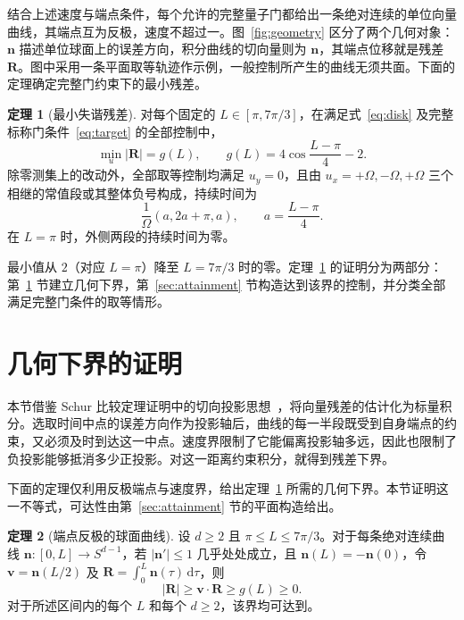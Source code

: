 \documentclass[12pt]{iopjournal}
\theoremstyle{definition}
\newtheorem{theorem}{定理}
\newcommand{\dd}{\mathrm{d}}
\newcommand{\nvec}{\mathbf n}
\newcommand{\Rvec}{\mathbf R}
\newcommand{\vvec}{\mathbf v}
\begin{document}
结合上述速度与端点条件，每个允许的完整量子门都给出一条绝对连续的单位向量曲线，其端点互为反极，速度不超过一。图~\ref{fig:geometry} 区分了两个几何对象：$\nvec$ 描述单位球面上的误差方向，积分曲线的切向量则为 $\nvec$，其端点位移就是残差 $\Rvec$。图中采用一条平面取等轨迹作示例，一般控制所产生的曲线无须共面。下面的定理确定完整门约束下的最小残差。




\begin{theorem}[最小失谐残差]
\label{thm:gate}
对每个固定的 $L\in[\pi,7\pi/3]$，在满足式~\eqref{eq:disk} 及完整标称门条件~\eqref{eq:target} 的全部控制中，
\begin{equation}
 \boxed{\min_u|\Rvec|=g(L),\qquad
 g(L)=4\cos\frac{L-\pi}{4}-2.}
 \label{eq:residual-minimum}
\end{equation}
除零测集上的改动外，全部取等控制均满足 $u_y=0$，且由 $u_x=+\Omega,-\Omega,+\Omega$ 三个相继的常值段或其整体负号构成，持续时间为
\begin{equation}
 \frac{1}{\Omega}(a,2a+\pi,a),\qquad
 a=\frac{L-\pi}{4}.
 \label{eq:family-durations}
\end{equation}
在 $L=\pi$ 时，外侧两段的持续时间为零。
\end{theorem}

最小值从 $2$（对应 $L=\pi$）降至 $L=7\pi/3$ 时的零。定理~\ref{thm:gate} 的证明分为两部分：第~\ref{sec:midpoint} 节建立几何下界，第~\ref{sec:attainment} 节构造达到该界的控制，并分类全部满足完整门条件的取等情形。

\section{几何下界的证明}
\label{sec:midpoint}

本节借鉴 Schur 比较定理证明中的切向投影思想~\cite{sullivan2008}，将向量残差的估计化为标量积分。选取时间中点的误差方向作为投影轴后，曲线的每一半段既受到自身端点的约束，又必须及时到达这一中点。速度界限制了它能偏离投影轴多远，因此也限制了负投影能够抵消多少正投影。对这一距离约束积分，就得到残差下界。

下面的定理仅利用反极端点与速度界，给出定理~\ref{thm:gate} 所需的几何下界。本节证明这一不等式，可达性由第~\ref{sec:attainment} 节的平面构造给出。

\begin{theorem}[端点反极的球面曲线]
\label{thm:sphere}
设 $d\ge2$ 且 $\pi\le L\le7\pi/3$。对于每条绝对连续曲线 $\nvec:[0,L]\to S^{d-1}$，若 $|\nvec'|\le1$ 几乎处处成立，且 $\nvec(L)=-\nvec(0)$，令 $\vvec=\nvec(L/2)$ 及 $\Rvec=\int_0^L\nvec(\tau)\,\dd\tau$，则
\begin{equation}
 |\Rvec|\ge\vvec\cdot\Rvec\ge g(L)\ge0.
 \label{eq:sphere-bound}
\end{equation}
对于所述区间内的每个 $L$ 和每个 $d\ge2$，该界均可达到。
\end{theorem}
\end{document}
